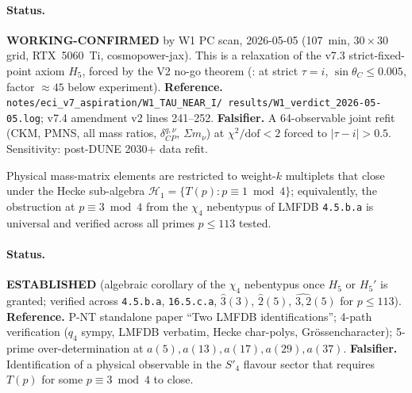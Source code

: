 \paragraph{Status.}  \textbf{WORKING-CONFIRMED} by W1 PC scan,
2026-05-05 (107~min, $30\times 30$ grid, RTX~5060~Ti, cosmopower-jax).
This is a relaxation of the v7.3 strict-fixed-point axiom $H_5$, forced
by the V2 no-go theorem (\cite{V2NoGo}: at strict $\tau = i$,
$\sin\theta_C \le 0.005$, factor $\approx 45$ below experiment).
\textbf{Reference.}  \texttt{notes/eci\_v7\_aspiration/W1\_TAU\_NEAR\_I/
results/W1\_verdict\_2026-05-05.log}; v7.4 amendment v2 lines 241--252.
\textbf{Falsifier.}  A 64-observable joint refit (CKM, PMNS, all mass
ratios, $\delta_{CP}^{q,\nu}$, $\Sigma m_\nu$) at $\chi^2/\mathrm{dof}<2$
forced to $|\tau - i| > 0.5$.  Sensitivity: post-DUNE 2030+ data refit.

\begin{axiom*}
Physical mass-matrix elements are restricted to weight-$k$ multiplets
that close under the Hecke sub-algebra $\mathcal{H}_1 = \{T(p) : p
\equiv 1 \bmod 4\}$; equivalently, the obstruction at $p \equiv 3
\bmod 4$ from the $\chi_4$ nebentypus of LMFDB \texttt{4.5.b.a} is
universal and verified across all primes $p \le 113$ tested.
\end{axiom*}

\paragraph{Status.}  \textbf{ESTABLISHED} (algebraic corollary of the
$\chi_4$ nebentypus once $H_5$ or $H_5'$ is granted; verified across
\texttt{4.5.b.a}, \texttt{16.5.c.a}, $\widehat{3}(3)$, $\widehat{2}(5)$,
$\widehat{3,2}(5)$ for $p\le 113$).  \textbf{Reference.}  P-NT
standalone paper ``Two LMFDB identifications''; \cite{eci.tex} 4-path
verification ($q_4$ sympy, LMFDB verbatim, Hecke char-polys, Grössencharacter); 5-prime over-determination at $a(5),a(13),a(17),a(29),
a(37)$.  \textbf{Falsifier.}  Identification of a physical observable
in the $S'_4$ flavour sector that requires $T(p)$ for some $p \equiv 3
\bmod 4$ to close.


